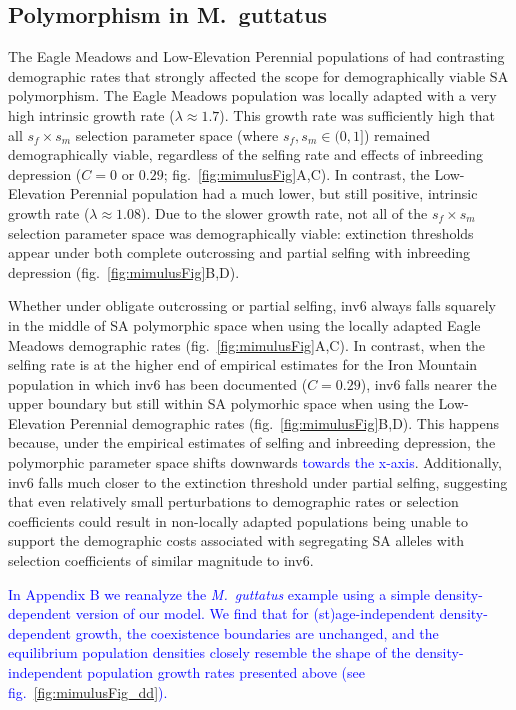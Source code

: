 \documentclass[11pt]{article}
\begin{document}
\subsection*{Polymorphism in M.~guttatus} \label{sec:Mgutt}

The Eagle Meadows and Low-Elevation Perennial populations of \citet{PetersonEtAl2016} had contrasting demographic rates that strongly affected the scope for demographically viable SA polymorphism. The Eagle Meadows population was locally adapted with a very high intrinsic growth rate ($\lambda \approx 1.7$). This growth rate was sufficiently high that all $s_f \times s_m$ selection parameter space (where $s_f, s_m \in (0,1]$) remained demographically viable, regardless of the selfing rate and effects of inbreeding depression ($C = 0$ or $0.29$; fig.~\ref{fig:mimulusFig}A,C). In contrast, the Low-Elevation Perennial population had a much lower, but still positive, intrinsic growth rate ($\lambda \approx 1.08$). Due to the slower growth rate, not all of the $s_f \times s_m$ selection parameter space was demographically viable: extinction thresholds appear under both complete outcrossing and partial selfing with inbreeding depression (fig.~\ref{fig:mimulusFig}B,D).

Whether under obligate outcrossing or partial selfing, inv6 always falls squarely in the middle of SA polymorphic space when using the locally adapted Eagle Meadows demographic rates (fig.~\ref{fig:mimulusFig}A,C). In contrast, when the selfing rate is at the higher end of empirical estimates for the Iron Mountain population in which inv6 has been documented ($C = 0.29$), inv6 falls nearer the upper boundary but still within SA polymorhic space when using the Low-Elevation Perennial demographic rates (fig.~\ref{fig:mimulusFig}B,D). This happens because, under the empirical estimates of selfing and inbreeding depression, the polymorphic parameter space shifts downwards \textcolor{blue}{towards the x-axis}. Additionally, inv6 falls much closer to the extinction threshold under partial selfing, suggesting that even relatively small perturbations to demographic rates or selection coefficients could result in non-locally adapted populations being unable to support the demographic costs associated with segregating SA alleles with selection coefficients of similar magnitude to inv6. 

\textcolor{blue}{In Appendix B we reanalyze the {\itshape M.~guttatus} example using a simple density-dependent version of our model. We find that for (st)age-independent density-dependent growth, the coexistence boundaries are unchanged, and the equilibrium population densities closely resemble the shape of the density-independent population growth rates presented above (see fig.~\ref{fig:mimulusFig_dd}). }
\end{document}
